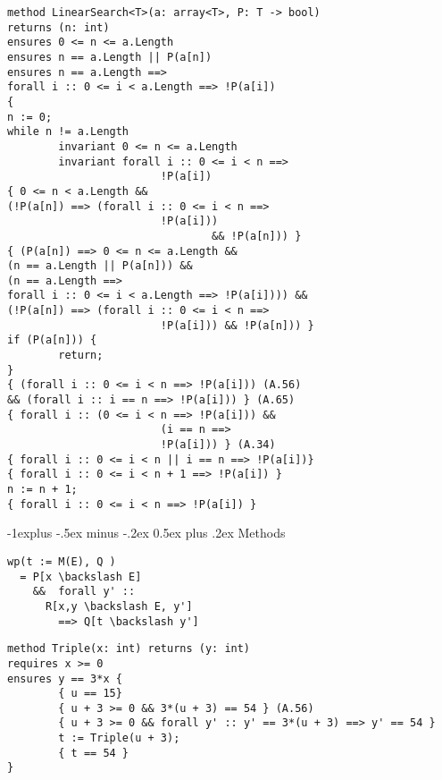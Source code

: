 \documentclass[10pt,landscape]{article}
\makeatletter
\renewcommand{\subsection}{\@startsection{subsection}{2}{0mm}%
                                {-1explus -.5ex minus -.2ex}%
                                {0.5ex plus .2ex}%
                                {\normalfont\normalsize\bfseries}}
\makeatother
\begin{document}
\begin{multicols}{3}
\begin{multicols}{2}
\columnbreak
\begin{tiny}
\begin{verbatim}
method LinearSearch<T>(a: array<T>, P: T -> bool)
returns (n: int)
ensures 0 <= n <= a.Length
ensures n == a.Length || P(a[n])
ensures n == a.Length ==>
forall i :: 0 <= i < a.Length ==> !P(a[i])
{
n := 0;
while n != a.Length
        invariant 0 <= n <= a.Length
        invariant forall i :: 0 <= i < n ==>
                        !P(a[i])
{ 0 <= n < a.Length &&
(!P(a[n]) ==> (forall i :: 0 <= i < n ==>
                        !P(a[i])) 
                                && !P(a[n])) }
{ (P(a[n]) ==> 0 <= n <= a.Length &&
(n == a.Length || P(a[n])) &&
(n == a.Length ==>
forall i :: 0 <= i < a.Length ==> !P(a[i]))) &&
(!P(a[n]) ==> (forall i :: 0 <= i < n ==> 
                        !P(a[i])) && !P(a[n])) }
if (P(a[n])) {
        return;
}
{ (forall i :: 0 <= i < n ==> !P(a[i])) (A.56)
&& (forall i :: i == n ==> !P(a[i])) } (A.65)
{ forall i :: (0 <= i < n ==> !P(a[i])) &&
                        (i == n ==>
                        !P(a[i])) } (A.34)
{ forall i :: 0 <= i < n || i == n ==> !P(a[i])}
{ forall i :: 0 <= i < n + 1 ==> !P(a[i]) }
n := n + 1;
{ forall i :: 0 <= i < n ==> !P(a[i]) }
\end{verbatim}
\end{tiny}
\end{multicols}

\subsection{Methods} 
\begin{multicols}{2}
\begin{verbatim}
wp(t := M(E), Q )
  = P[x \backslash E]
    &&  forall y' ::
      R[x,y \backslash E, y'] 
        ==> Q[t \backslash y']
\end{verbatim}
\columnbreak
\begin{scriptsize}
\begin{verbatim}
method Triple(x: int) returns (y: int)
requires x >= 0
ensures y == 3*x {
        { u == 15}
        { u + 3 >= 0 && 3*(u + 3) == 54 } (A.56)
        { u + 3 >= 0 && forall y' :: y' == 3*(u + 3) ==> y' == 54 }
        t := Triple(u + 3);
        { t == 54 }
}
\end{verbatim}
\end{scriptsize}
\end{multicols}




\end{multicols}
\end{document}
